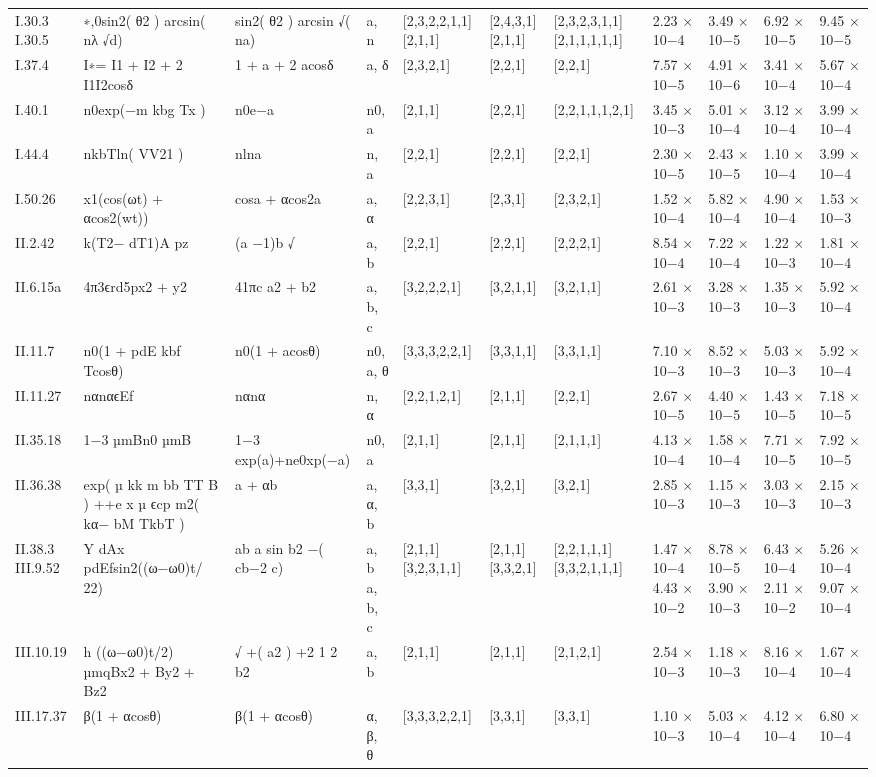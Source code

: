 \begin{tabular}{lllllllllll}
I.30.3 I.30.5 & ∗,0sin2( θ2 ) arcsin( nλ √d) & sin2( θ2 ) arcsin √( na) & a, n & [2,3,2,2,1,1] [2,1,1] & [2,4,3,1] [2,1,1] & [2,3,2,3,1,1] [2,1,1,1,1,1] & 2.23 × 10−4 & 3.49 × 10−5 & 6.92 × 10−5 & 9.45 × 10−5 \\
I.37.4 & I∗= I1 + I2 + 2 I1I2cosδ & 1 + a + 2 acosδ & a, δ & [2,3,2,1] & [2,2,1] & [2,2,1] & 7.57 × 10−5 & 4.91 × 10−6 & 3.41 × 10−4 & 5.67 × 10−4 \\
I.40.1 & n0exp(−m kbg Tx ) & n0e−a & n0, a & [2,1,1] & [2,2,1] & [2,2,1,1,1,2,1] & 3.45 × 10−3 & 5.01 × 10−4 & 3.12 × 10−4 & 3.99 × 10−4 \\
I.44.4 & nkbTln( VV21 ) & nlna & n, a & [2,2,1] & [2,2,1] & [2,2,1] & 2.30 × 10−5 & 2.43 × 10−5 & 1.10 × 10−4 & 3.99 × 10−4 \\
I.50.26 & x1(cos(ωt) + αcos2(wt)) & cosa + αcos2a & a, α & [2,2,3,1] & [2,3,1] & [2,3,2,1] & 1.52 × 10−4 & 5.82 × 10−4 & 4.90 × 10−4 & 1.53 × 10−3 \\
II.2.42 & k(T2− dT1)A pz & (a −1)b √ & a, b & [2,2,1] & [2,2,1] & [2,2,2,1] & 8.54 × 10−4 & 7.22 × 10−4 & 1.22 × 10−3 & 1.81 × 10−4 \\
II.6.15a & 4π3ϵrd5px2 + y2 & 41πc a2 + b2 & a, b, c & [3,2,2,2,1] & [3,2,1,1] & [3,2,1,1] & 2.61 × 10−3 & 3.28 × 10−3 & 1.35 × 10−3 & 5.92 × 10−4 \\
II.11.7 & n0(1 + pdE kbf Tcosθ) & n0(1 + acosθ) & n0, a, θ & [3,3,3,2,2,1] & [3,3,1,1] & [3,3,1,1] & 7.10 × 10−3 & 8.52 × 10−3 & 5.03 × 10−3 & 5.92 × 10−4 \\
II.11.27 & nαnαϵEf & nαnα & n, α & [2,2,1,2,1] & [2,1,1] & [2,2,1] & 2.67 × 10−5 & 4.40 × 10−5 & 1.43 × 10−5 & 7.18 × 10−5 \\
II.35.18 & 1−3 µmBn0 µmB & 1−3 exp(a)+ne0xp(−a) & n0, a & [2,1,1] & [2,1,1] & [2,1,1,1] & 4.13 × 10−4 & 1.58 × 10−4 & 7.71 × 10−5 & 7.92 × 10−5 \\
II.36.38 & exp( µ kk m bb TT B ) ++e x µ ϵcp m2( kα− bM TkbT ) & a + αb & a, α, b & [3,3,1] & [3,2,1] & [3,2,1] & 2.85 × 10−3 & 1.15 × 10−3 & 3.03 × 10−3 & 2.15 × 10−3 \\
II.38.3 III.9.52 & Y dAx pdEfsin2((ω−ω0)t/ 22) & ab a sin b2 −( cb−2 c) & a, b a, b, c & [2,1,1] [3,2,3,1,1] & [2,1,1] [3,3,2,1] & [2,2,1,1,1] [3,3,2,1,1,1] & 1.47 × 10−4 4.43 × 10−2 & 8.78 × 10−5 3.90 × 10−3 & 6.43 × 10−4 2.11 × 10−2 & 5.26 × 10−4 9.07 × 10−4 \\
III.10.19 & h ((ω−ω0)t/2) µmqBx2 + By2 + Bz2 & √ +( a2 ) +2 1 2 b2 & a, b & [2,1,1] & [2,1,1] & [2,1,2,1] & 2.54 × 10−3 & 1.18 × 10−3 & 8.16 × 10−4 & 1.67 × 10−4 \\
III.17.37 & β(1 + αcosθ) & β(1 + αcosθ) & α, β, θ & [3,3,3,2,2,1] & [3,3,1] & [3,3,1] & 1.10 × 10−3 & 5.03 × 10−4 & 4.12 × 10−4 & 6.80 × 10−4 \\
\bottomrule
\end{tabular}
